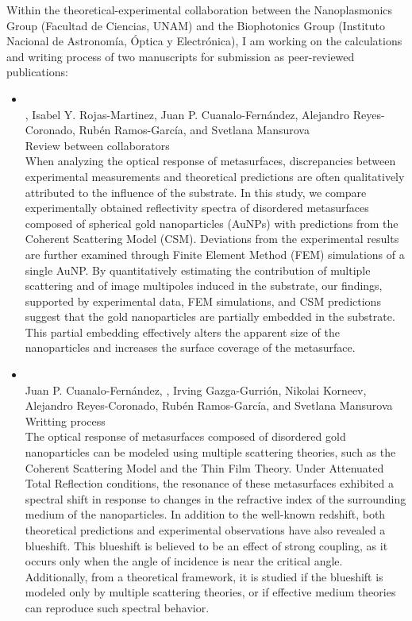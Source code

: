 Within the theoretical-experimental collaboration between the Nanoplasmonics Group (Facultad de Ciencias, UNAM) and the Biophotonics Group (Instituto Nacional de Astronomía, Óptica y  Electrónica), I am working on the calculations and writing process of two manuscripts for submission as peer-reviewed publications:
%
\begin{itemize}
	\renewcommand\labelitemi{\textcolor{pblueFC}{$\blacktriangleright$}}	
	\item {}\\
			 , Isabel Y. Rojas-Martinez, Juan P. Cuanalo-Fernández, Alejandro Reyes-Coronado, Rubén Ramos-García, and %
							Svetlana Mansurova\\
			 Review between collaborators\\
			 When analyzing the optical response of metasurfaces, discrepancies between experimental measurements and theoretical predictions are often qualitatively attributed to the influence of the substrate. In this study, we compare experimentally obtained reflectivity spectra of disordered metasurfaces composed of spherical gold nanoparticles (AuNPs) with predictions from the Coherent Scattering Model (CSM). Deviations from the experimental results are further examined through Finite Element Method (FEM) simulations of a single AuNP. By quantitatively estimating the contribution of multiple scattering and of image multipoles induced in the substrate, our findings, supported by experimental data, FEM simulations, and CSM predictions suggest that the gold nanoparticles are partially embedded in the substrate. This partial embedding effectively alters the apparent size of the nanoparticles and increases the surface coverage of the metasurface.
%	
	\item {}\\
			  Juan P. Cuanalo-Fernández, , Irving Gazga-Gurrión,  Nikolai Korneev, Alejandro Reyes-Coronado, Rubén Ramos-García, and %
			Svetlana Mansurova\\
			 Writting process\\
			 The optical response of metasurfaces composed of disordered gold nanoparticles can be modeled using multiple scattering theories, such as the Coherent Scattering Model and the Thin Film Theory. Under Attenuated Total Reflection conditions, the resonance of these metasurfaces exhibited a spectral shift in response to changes in the refractive index of the surrounding medium of the nanoparticles. In addition to the well-known redshift, both theoretical predictions and experimental observations have also revealed a blueshift. This blueshift is believed  to be an effect of strong coupling, as it occurs only when the angle of incidence is near the critical angle. Additionally, from a theoretical framework, it is studied if the blueshift is modeled only by multiple scattering theories, or if effective medium theories can reproduce such spectral behavior.
\end{itemize}


